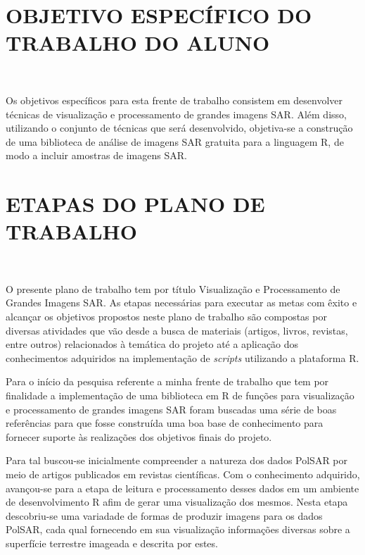 \documentclass[12pt]{article}
\begin{document}
\newpage
\section*{\centering \textbf{OBJETIVO ESPECÍFICO DO TRABALHO DO ALUNO}}
\hrulefill \\

\vspace{0.5cm}

Os objetivos específicos para esta frente de trabalho consistem em desenvolver técnicas de visualização e processamento de grandes imagens SAR. Além disso, utilizando o conjunto de técnicas que será desenvolvido, objetiva-se a construção de uma biblioteca de análise de imagens SAR gratuita para a linguagem R, de modo a incluir amostras de imagens SAR.



\newpage
\section*{\centering \textbf{ETAPAS DO PLANO DE TRABALHO}}
\hrulefill \\

\vspace{0.5cm}

O presente plano de trabalho tem por título Visualização e Processamento de Grandes Imagens SAR. As etapas necessárias para executar as metas com êxito e alcançar os objetivos propostos neste plano de trabalho são compostas por diversas atividades que vão desde a busca de materiais (artigos, livros, revistas, entre outros) relacionados à temática do projeto até a aplicação dos conhecimentos adquiridos na implementação de \textit{scripts} utilizando a plataforma R. 

Para o início da pesquisa referente a minha frente de trabalho que tem por finalidade a implementação de uma biblioteca em R de funções para visualização e processamento de grandes imagens SAR foram buscadas uma série de boas referências para que fosse construída uma boa base de conhecimento para fornecer suporte às realizações dos objetivos finais do projeto.

Para tal buscou-se inicialmente compreender a natureza dos dados PolSAR por meio de artigos publicados em revistas científicas. Com o conhecimento adquirido, avançou-se para a etapa de leitura e processamento desses dados em um ambiente de desenvolvimento R afim de gerar uma visualização dos mesmos. Nesta etapa descobriu-se uma variadade de formas de produzir imagens para os dados PolSAR, cada qual fornecendo em sua visualização informações diversas sobre a superfície terrestre imageada e descrita por estes.
\end{document}
